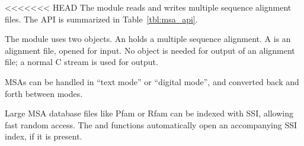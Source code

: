 <<<<<<< HEAD
The  module reads and writes multiple sequence alignment
files. The API is summarized in Table~\ref{tbl:msa_api}.

The module uses two objects. An  holds a multiple
sequence alignment. A  is an alignment file,
opened for input. No object is needed for output of an alignment file;
a normal C  stream is used for output.  

MSAs can be handled in ``text mode'' or ``digital mode'', and
converted back and forth between modes.

Large MSA database files like Pfam or Rfam can be indexed with SSI,
allowing fast random access.  The  and
 functions automatically open an
accompanying SSI index, if it is present.

